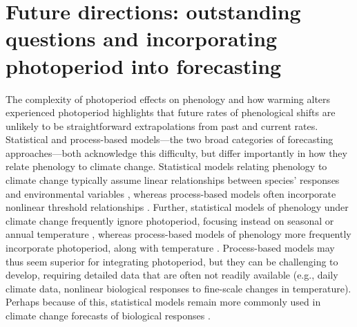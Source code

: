 \documentclass{article}
\begin{document}
\section*{Future directions: outstanding questions and incorporating photoperiod into forecasting}
\par The complexity of photoperiod effects on phenology and how warming alters experienced photoperiod highlights that future rates of phenological shifts are unlikely to be straightforward extrapolations from past and current rates. Statistical and process-based models---the two broad categories of forecasting approaches---both acknowledge this difficulty, but differ importantly in how they relate phenology to climate change. Statistical models relating phenology to climate change typically assume linear relationships between species' responses and environmental variables \citep[e.g., ][]{flynn2018,ibanez2010}, whereas process-based models often incorporate nonlinear threshold relationships \citep[e.g.][]{chuine2001,morin2009}. Further, statistical models of phenology under climate change frequently ignore photoperiod, focusing instead on seasonal or annual temperature \citep[e.g.][but see \citet{richardson2013}]{diez2012,ibanez2010}, whereas process-based models of phenology more frequently incorporate photoperiod, along with temperature \citep{lundell2020,duputie2015,zhao2013,morin2009}. Process-based models may thus seem superior for integrating photoperiod, but they can be challenging to develop, requiring detailed data that are often not readily available (e.g., daily climate data, nonlinear biological responses to fine-scale changes in temperature). Perhaps because of this, statistical models remain more commonly used in climate change forecasts of biological responses \citep[e.g.,][]{garcia2016,Basler:2012,diez2012,zhu2012,ibanez2010}.
\end{document}
